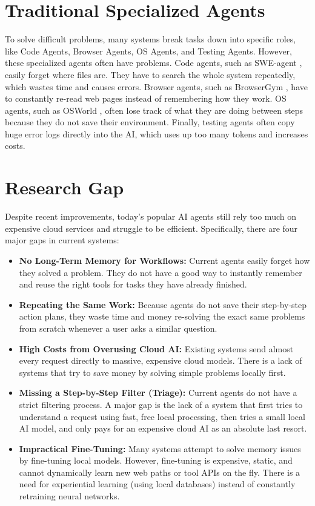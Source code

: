 \section{Traditional Specialized Agents}
To solve difficult problems, many systems break tasks down into specific roles, like Code Agents, Browser Agents, OS Agents, and Testing Agents. However, these specialized agents often have problems. Code agents, such as SWE-agent \cite{yang2024sweagent}, easily forget where files are. They have to search the whole system repeatedly, which wastes time and causes errors. Browser agents, such as BrowserGym \cite{chezelles2025browsergym}, have to constantly re-read web pages instead of remembering how they work. OS agents, such as OSWorld \cite{xie2024osworld}, often lose track of what they are doing between steps because they do not save their environment. Finally, testing agents often copy huge error logs directly into the AI, which uses up too many tokens and increases costs.\\

\section{Research Gap}
Despite recent improvements, today's popular AI agents still rely too much on expensive cloud services and struggle to be efficient. Specifically, there are four major gaps in current systems:\\

\begin{itemize}
    \item \textbf{No Long-Term Memory for Workflows:} Current agents easily forget how they solved a problem. They do not have a good way to instantly remember and reuse the right tools for tasks they have already finished.
    \item \textbf{Repeating the Same Work:} Because agents do not save their step-by-step action plans, they waste time and money re-solving the exact same problems from scratch whenever a user asks a similar question.
    \item \textbf{High Costs from Overusing Cloud AI:} Existing systems send almost every request directly to massive, expensive cloud models. There is a lack of systems that try to save money by solving simple problems locally first.
    \item \textbf{Missing a Step-by-Step Filter (Triage):} Current agents do not have a strict filtering process. A major gap is the lack of a system that first tries to understand a request using fast, free local processing, then tries a small local AI model, and only pays for an expensive cloud AI as an absolute last resort.
    \item \textbf{Impractical Fine-Tuning:} Many systems attempt to solve memory issues by fine-tuning local models. However, fine-tuning is expensive, static, and cannot dynamically learn new web paths or tool APIs on the fly. There is a need for experiential learning (using local databases) instead of constantly retraining neural networks.
\end{itemize}

